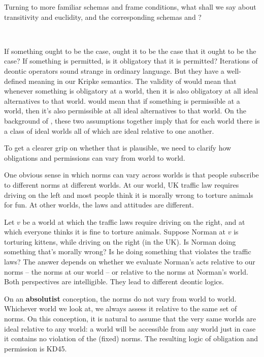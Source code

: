 
Turning to more familiar schemas and frame conditions, what shall we say about
transitivity and euclidity, and the corresponding schemas  and ?
%
\begin{principles}
\\
\end{principles}
%
If something ought to be the case, ought it to be the case that it ought to be
the case? If something is permitted, is it obligatory that it is permitted?
Iterations of deontic operators sound strange in ordinary language. But they
have a well-defined meaning in our Kripke semantics. The validity of 
would mean that whenever something is obligatory at a world, then it is also
obligatory at all ideal alternatives to that world.  would mean that if
something is permissible at a world, then it's also permissible at all ideal
alternatives to that world. On the background of , these two assumptions
together imply that for each world there is a class of ideal worlds all of which
are ideal relative to one another.

To get a clearer grip on whether that is plausible, we need to clarify how
obligations and permissions can vary from world to world.

One obvious sense in which norms can vary across worlds is that people subscribe
to different norms at different worlds. At our world, UK traffic law requires
driving on the left and most people think it is morally wrong to torture
animals for fun. At other worlds, the laws and attitudes are different.

Let $v$ be a world at which the traffic laws require driving on the right, and
at which everyone thinks it is fine to torture animals. Suppose Norman at $v$ is
torturing kittens, while driving on the right (in the UK). Is Norman doing
something that's morally wrong? Is he doing something that violates the traffic
laws? The answer depends on whether we evaluate Norman's acts relative to our
norms -- the norms at our world -- or relative to the norms at Norman's world.
Both perspectives are intelligible. They lead to different deontic logics.

On an \textbf{absolutist} conception, the norms do not vary from world to world.
Whichever world we look at, we always assess it relative to the same set of
norms. On this conception, it is natural to assume that the very same worlds are
ideal relative to any world: a world will be accessible from any world just in
case it contains no violation of the (fixed) norms. The resulting logic of
obligation and permission is KD45.

